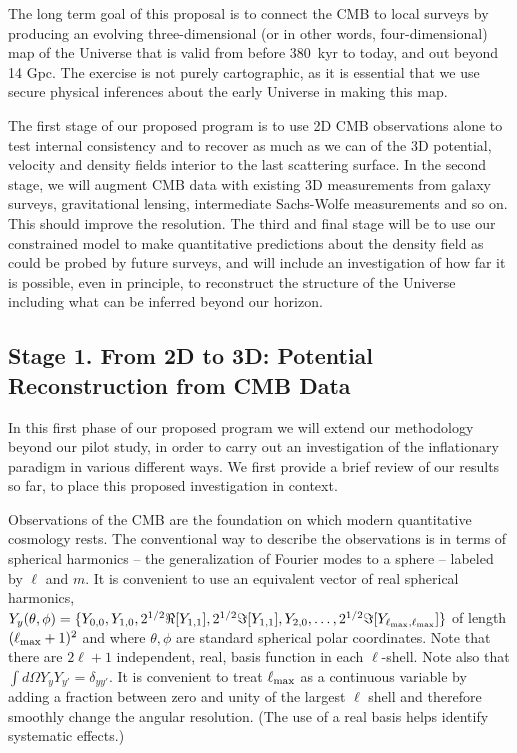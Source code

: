 \documentclass[psfig,12pt]{article}
\def\ni{\noindent}
\begin{document}
The long term goal of this proposal is to connect the CMB to local
surveys by producing an evolving three-dimensional (or in other
words, four-dimensional) map of the Universe that is valid from before 380~kyr to
today, and out beyond 14 Gpc. The exercise is not purely cartographic, as
it is essential that we use secure physical inferences
about the early Universe in making this map.

The first stage of our proposed program is to use 2D CMB observations alone
to test internal consistency and to recover as much as we can of the 3D
potential, velocity and density fields interior to the last scattering
surface. In the second stage, we will augment CMB data with existing 3D
measurements from galaxy surveys, gravitational lensing, intermediate
Sachs-Wolfe measurements and so on. This should improve the resolution.
The third and final stage will be to use our constrained model to make
quantitative predictions about the density field as could be probed
by future surveys, and will include
an investigation of how far it is
possible, even in principle, to reconstruct the structure of the
Universe including what can be inferred beyond our horizon.


\subsection{Stage 1. From 2D to 3D: Potential Reconstruction from CMB Data}

In this first phase of our proposed program we will extend our
methodology beyond our pilot study, in order to carry out an
investigation of the inflationary paradigm in various different ways. We
first provide a  brief review of our results so far, to place this
proposed investigation in context.

\ni{\bf CMB Temperature Fluctuation Input Data:}
Observations of the CMB are the foundation on which modern
quantitative cosmology rests. The
conventional way to describe the observations is in terms of spherical
harmonics -- the generalization of Fourier modes to a sphere -- labeled
by $\ell$ and $m$. It is convenient to use an equivalent vector of real
spherical harmonics,
$Y_y(\theta,\phi)=\{Y_{0,0},Y_{1,0},2^{1/2}\Re[Y_{1,1}],2^{1/2}\Im[Y_{1,1}],Y_{2,0},\dots,2^{1/2}\Im[Y_{\ell_{\rm
max},\ell_{\rm max}}]\}$ of length $(\ell_{\rm max}+1)^2$ and where
$\theta,\phi$ are standard spherical polar coordinates. Note that there
are $2\ell+1$ independent, real, basis function in each $\ell$-shell.
Note also that $\int d\Omega Y_yY_{y'}=\delta_{yy'}$. It is convenient
to treat $\ell_{\rm max}$ as a continuous variable by adding a fraction
between zero and unity of the largest $\ell$ shell and therefore
smoothly change the angular resolution. (The use of a real basis helps
identify systematic effects.)
\end{document}
